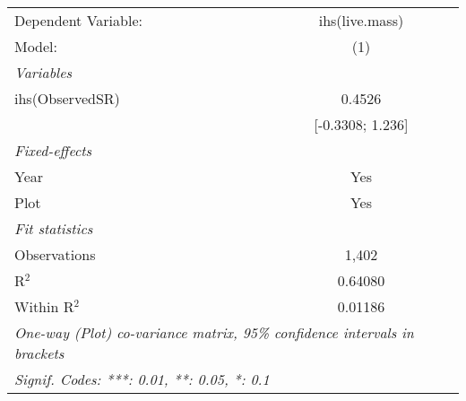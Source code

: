 \begin{tabular}{lc}
\tabularnewline\midrule\midrule
Dependent Variable:&ihs(live.mass)\\
Model:&(1)\\
\midrule \emph{Variables}&  \\
ihs(ObservedSR)&0.4526\\
  &[-0.3308; 1.236]\\
\midrule \emph{Fixed-effects}&  \\
Year & Yes\\
Plot & Yes\\
\midrule \emph{Fit statistics}&  \\
Observations & 1,402\\
R$^2$ & 0.64080\\
Within R$^2$ & 0.01186\\
\midrule\midrule\multicolumn{2}{l}{\emph{One-way (Plot) co-variance matrix, 95\% confidence intervals in brackets}}\\
\multicolumn{2}{l}{\emph{Signif. Codes: ***: 0.01, **: 0.05, *: 0.1}}\\
\end{tabular}


